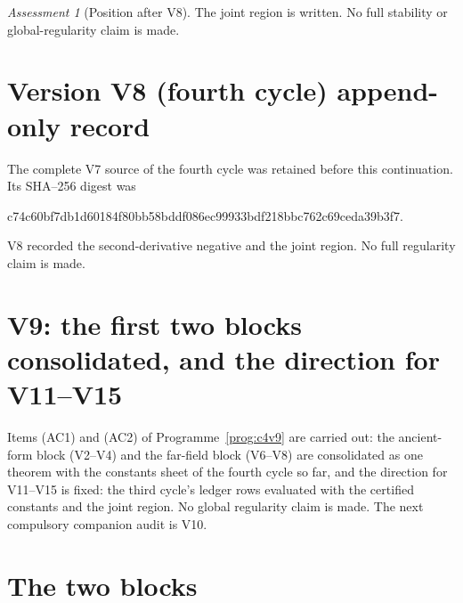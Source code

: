 \documentclass[11pt]{article}
\theoremstyle{plain}
\theoremstyle{definition}
\theoremstyle{remark}
\newtheorem{assessment}[theorem]{Assessment}
\begin{document}
\begin{assessment}[Position after V8]
\label{ass:c4v8-position}
The joint region is written.  No full stability or global-regularity
claim is made.
\end{assessment}

\section*{Version V8 (fourth cycle) append-only record}

The complete V7 source of the fourth cycle was retained before this
continuation.  Its SHA--256 digest was
\begin{center}\scriptsize\ttfamily
c74c60bf7db1d60184f80bb58bddf086ec99933bdf218bbc762c69ceda39b3f7.
\end{center}
V8 recorded the second-derivative negative and the joint region.  No
full regularity claim is made.

\section{V9: the first two blocks consolidated, and the direction for V11--V15}
\label{sec:c4v9-entry}

Items (AC1) and (AC2) of Programme~\ref{prog:c4v9} are carried out:
the ancient-form block (V2--V4) and the far-field block (V6--V8) are
consolidated as one theorem with the constants sheet of the fourth
cycle so far, and the direction for V11--V15 is fixed: the third
cycle's ledger rows evaluated with the certified constants and the
joint region.  No global regularity claim is made.  The next
compulsory companion audit is V10.

\section{The two blocks}
\label{sec:c4v9-blocks}
\end{document}

